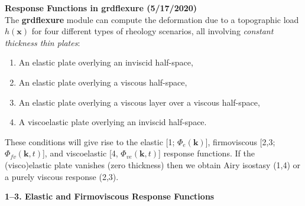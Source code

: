 \documentclass[12pt]{article}
\begin{document}

{\center \bf Response Functions in grdflexure (5/17/2020)}\\

The {\bf grdflexure} module can compute the deformation due to a topographic load $h(\mathbf{x})$
for four different types of rheology scenarios, all involving \emph{constant thickness thin plates}:
\begin{enumerate}
	\item An elastic plate overlying an inviscid half-space,
	\item An elastic plate overlying a viscous half-space,
	\item An elastic plate overlying a viscous layer over a viscous half-space,
	\item A viscoelastic plate overlying an inviscid half-space.
\end{enumerate}
These conditions will give rise to the elastic [1; $\Phi_e(\mathbf{k})$], firmoviscous [2,3; $\Phi_{fv}(\mathbf{k},t)$],
and viscoelastic [4, $\Phi_{ve}(\mathbf{k},t)$] response functions.
If the (visco)elastic plate vanishes (zero thickness) then we obtain Airy isostasy (1,4) or a purely viscous response (2,3).

{\center \bf 1--3. Elastic and Firmoviscous Response Functions}\\
\end{document}
